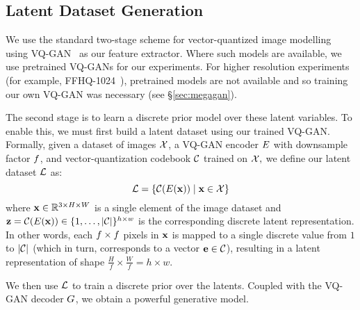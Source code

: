 
\subsection{Latent Dataset Generation}
We use the standard two-stage scheme for vector-quantized image
modelling~\cite{oord2018neural,razavi2019generating,esser2021taming,bondtaylor2021unleashing} using
VQ-GAN~\cite{esser2021taming} as our feature extractor. Where such models are
available, we use pretrained VQ-GANs for our experiments. For higher resolution
experiments (for example, FFHQ-1024~\cite{karras2019stylebased}), pretrained
models are not available and so training our own VQ-GAN was necessary (see
\S\ref{sec:megagan}).

The second stage is to learn a discrete prior model over these latent variables.
To enable this, we must first build a latent dataset using our trained VQ-GAN.
Formally, given a dataset of images $\mathcal{X}$, a VQ-GAN encoder
$E$ with downsample factor $f$, and vector-quantization codebook $\mathcal{C}$ trained on $\mathcal{X},$ we define
our latent dataset $\mathcal{L}$ as:
\begin{equation}
    \mathcal{L} = \{\mathcal{C}(E(\mathbf{x})) \mid \mathbf{x} \in \mathcal{X} \}
\end{equation}
where $\mathbf{x} \in \mathbb{R}^{3 \times H \times W}$ is a single element of the image
dataset and $\mathbf{z} = \mathcal{C}(E(\mathbf{x})) \in \{1, \dots,
|\mathcal{C}|\}^{h \times w}$ is the corresponding discrete latent
representation. In other words, each $f \times f$
pixels in $\mathbf{x}$ is mapped to a single discrete value from $1$ to
$|\mathcal{C}|$ (which in turn, corresponds to a vector $\mathbf{e} \in
\mathcal{C}$),
resulting in a latent representation of shape $\frac{H}{f} \times \frac{W}{f} =
h \times w$.

We then use $\mathcal{L}$ to train a discrete prior over the latents. Coupled
with the VQ-GAN decoder $G$, we obtain a powerful generative model. 

